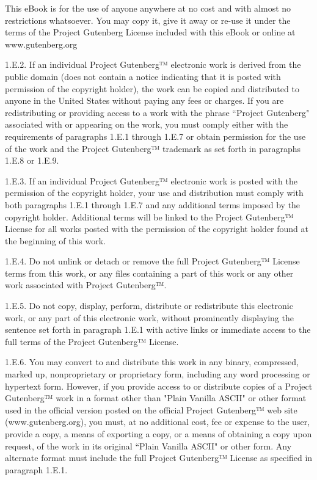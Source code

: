 {This eBook is for the use of anyone anywhere at no cost and with
almost no restrictions whatsoever. You may copy it, give it away or
re-use it under the terms of the Project Gutenberg License included
with this eBook or online at www.gutenberg.org

1.E.2. If an individual Project Gutenberg™ electronic work is derived
from the public domain (does not contain a notice indicating that it is
posted with permission of the copyright holder), the work can be copied
and distributed to anyone in the United States without paying any fees
or charges. If you are redistributing or providing access to a work
with the phrase “Project Gutenberg" associated with or appearing on the
work, you must comply either with the requirements of paragraphs 1.E.1
through 1.E.7 or obtain permission for the use of the work and the
Project Gutenberg™ trademark as set forth in paragraphs 1.E.8 or
1.E.9.

1.E.3. If an individual Project Gutenberg™ electronic work is posted
with the permission of the copyright holder, your use and distribution
must comply with both paragraphs 1.E.1 through 1.E.7 and any additional
terms imposed by the copyright holder. Additional terms will be linked
to the Project Gutenberg™ License for all works posted with the
permission of the copyright holder found at the beginning of this work.

1.E.4. Do not unlink or detach or remove the full Project Gutenberg™
License terms from this work, or any files containing a part of this
work or any other work associated with Project Gutenberg™.

1.E.5. Do not copy, display, perform, distribute or redistribute this
electronic work, or any part of this electronic work, without
prominently displaying the sentence set forth in paragraph 1.E.1 with
active links or immediate access to the full terms of the Project
Gutenberg™ License.

1.E.6. You may convert to and distribute this work in any binary,
compressed, marked up, nonproprietary or proprietary form, including any
word processing or hypertext form. However, if you provide access to or
distribute copies of a Project Gutenberg™ work in a format other than
"Plain Vanilla ASCII" or other format used in the official version
posted on the official Project Gutenberg™ web site (www.gutenberg.org),
you must, at no additional cost, fee or expense to the user, provide a
copy, a means of exporting a copy, or a means of obtaining a copy upon
request, of the work in its original “Plain Vanilla ASCII" or other
form. Any alternate format must include the full Project Gutenberg™
License as specified in paragraph 1.E.1.

}
